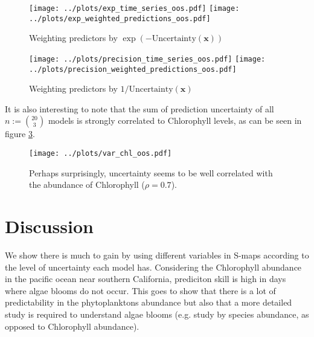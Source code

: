 \documentclass[fleqn,10pt]{wlscirep}
\newcommand{\un}{\text{Uncertainty}}
\newcommand{\x}{\mathbf{x}}
\begin{document}
\begin{figure}[ht]
\centering
\texttt{[image: ../plots/exp\_time\_series\_oos.pdf]}
\texttt{[image: ../plots/exp\_weighted\_predictions\_oos.pdf]}
\caption{Weighting predictors by $\exp \left ( -\un (\x) \right )$}
\label{fig:exp}
\end{figure}

\begin{figure}[ht]
  \centering
\texttt{[image: ../plots/precision\_time\_series\_oos.pdf]}
\texttt{[image: ../plots/precision\_weighted\_predictions\_oos.pdf]}
\caption{Weighting predictors by $1 / \un (\x)$}
\label{fig:prec}
\end{figure}

It is also interesting to note that the sum of prediction uncertainty
of all $n:=\binom{20}{3}$ models is strongly correlated to Chlorophyll levels, as
can be seen in figure \ref{fig:var chl}.

\begin{figure}[ht]
\centering
\texttt{[image: ../plots/var\_chl\_oos.pdf]}
\caption{Perhaps surprisingly, uncertainty seems to be well correlated
  with the abundance of Chlorophyll ($\rho = 0.7$).}
\label{fig:var chl}
\end{figure}

\section{Discussion}
We show there is much to gain by using different variables in S-maps
according to the level of uncertainty each model has. Considering the
Chlorophyll abundance in the pacific ocean near southern California,
prediciton skill is high in days where algae blooms do not occur. This
goes to show that there is a lot of predictability in the
phytoplanktons abundance but also that a more detailed study is
required to understand algae blooms (e.g. study by species abundance,
as opposed to Chlorophyll abundance).
\end{document}
